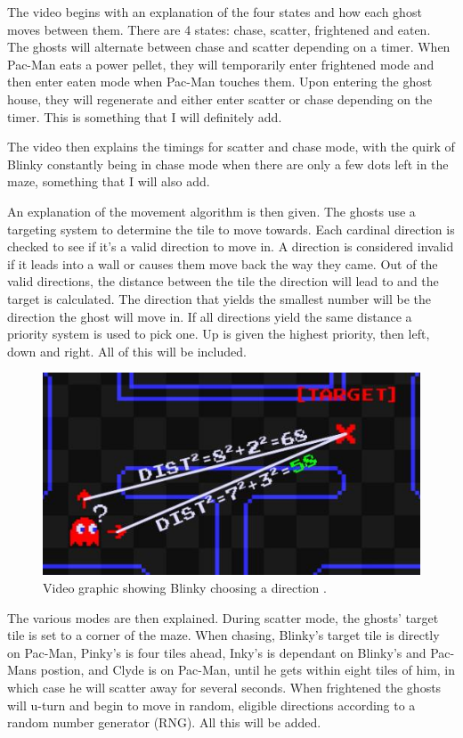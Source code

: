 \documentclass[letterpaper, 11pt]{article}
\begin{document}
The video begins with an explanation of the four states and how each ghost moves between them.
There are 4 states: chase, scatter, frightened and eaten.
The ghosts will alternate between chase and scatter depending on a timer.
When Pac-Man eats a power pellet, they will temporarily enter frightened mode and then enter eaten mode when Pac-Man touches them.
Upon entering the ghost house, they will regenerate and either enter scatter or chase depending on the timer.
This is something that I will definitely add.

The video then explains the timings for scatter and chase mode, with the quirk of Blinky constantly being in chase mode when there are only a few dots left in the maze, something that I will also add.

An explanation of the movement algorithm is then given.
The ghosts use a targeting system to determine the tile to move towards.
Each cardinal direction is checked to see if it’s a valid direction to move in.
A direction is considered invalid if it leads into a wall or causes them move back the way they came.
Out of the valid directions, the distance between the tile the direction will lead to and the target is calculated.
The direction that yields the smallest number will be the direction the ghost will move in.
If all directions yield the same distance a priority system is used to pick one.
Up is given the highest priority, then left, down and right.
All of this will be included.

\begin{figure}[htbp]
\centering
\includegraphics[width=0.50\linewidth]{./img/analysis/retro-game-mech/choose-direction.jpg}
\caption{\label{fig:choose-direction}Video graphic showing Blinky choosing a direction \autocite{RetroGameMechanicsExplained}.}
\end{figure}

The various modes are then explained.
During scatter mode, the ghosts’ target tile is set to a corner of the maze.
When chasing, Blinky’s target tile is directly on Pac-Man, Pinky’s is four tiles ahead, Inky’s is dependant on Blinky’s and Pac-Mans postion, and Clyde is on Pac-Man, until he gets within eight tiles of him, in which case he will scatter away for several seconds.
When frightened the ghosts will u-turn and begin to move in random, eligible directions according to a random number generator (RNG).
All this will be added.
\end{document}
